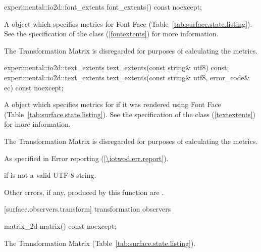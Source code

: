 \begin{itemdecl}
experimental::io2d::font_extents font_extents() const noexcept;
\end{itemdecl}
\begin{itemdescr}
\pnum
\returns
A  object which specifies metrics for Font Face (Table~\ref{tab:surface.state.listing}). See the specification of the  class (\ref{fontextents}) for more information.

\pnum
The Transformation Matrix is disregarded for purposes of calculating the metrics.
\end{itemdescr}

\begin{itemdecl}
experimental::io2d::text_extents text_extents(const string& utf8) const;
experimental::io2d::text_extents text_extents(const string& utf8,
  error_code& ec) const noexcept;
\end{itemdecl}
\begin{itemdescr}
\pnum
\returns
A  object which specifies metrics for  if it was rendered using Font Face (Table~\ref{tab:surface.state.listing}). See the specification of the  class (\ref{textextents}) for more information.

\pnum
The Transformation Matrix is disregarded for purposes of calculating the metrics.

\pnum
\throws
As specified in Error reporting (\ref{\iotwod.err.report}).

\pnum
\errors
{} if  is not a valid UTF-8 string.

\pnum
Other errors, if any, produced by this function are .
\end{itemdescr}

 [surface.observers.transform] { transformation observers}

\begin{itemdecl}
matrix_2d matrix() const noexcept;
\end{itemdecl}
\begin{itemdescr}
\pnum
\returns
The Transformation Matrix (Table~\ref{tab:surface.state.listing}).
\end{itemdescr}

